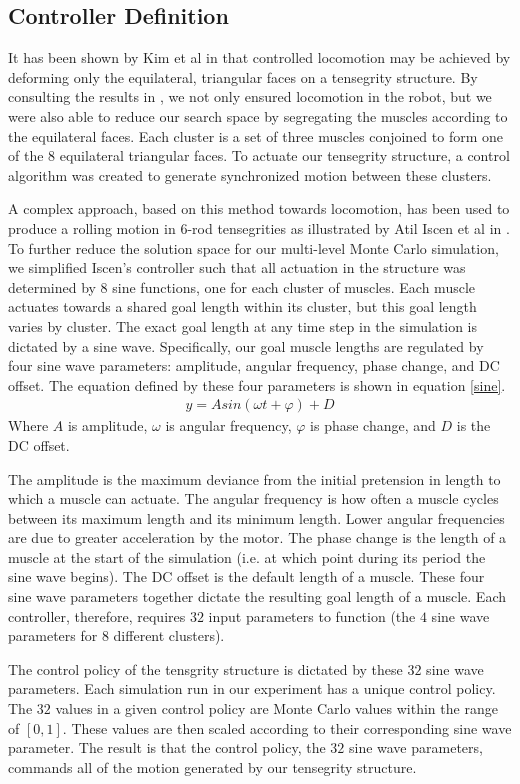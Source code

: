 \documentclass{llncs}
\begin{document}
\subsection{Controller Definition}
\label{controllerdefn} {
It has been shown by Kim et al in \cite{kim2014rapid} that controlled locomotion may be achieved by deforming only the equilateral, triangular faces on a tensegrity structure.
By consulting the results in \cite{kim2014rapid}, we not only ensured locomotion in the robot, but we were also able to reduce our search space by segregating the muscles according to the equilateral faces.
Each cluster is a set of three muscles conjoined to form one of the $8$ equilateral triangular faces.
To actuate our tensegrity structure, a control algorithm was created to generate synchronized motion between these clusters.

A complex approach, based on this method towards locomotion, has been used to produce a rolling motion in $6$-rod tensegrities as illustrated by Atil Iscen et al in \cite{iscen2013controlling}.
To further reduce the solution space for our multi-level Monte Carlo simulation, we simplified Iscen's controller such that all actuation in the structure was determined by $8$ sine functions, one for each cluster of muscles.
Each muscle actuates towards a shared goal length within its cluster, but this goal length varies by cluster.
The exact goal length at any time step in the simulation is dictated by a sine wave.
Specifically, our goal muscle lengths are regulated by four sine wave parameters: amplitude, angular frequency, phase change, and DC offset.
The equation defined by these four parameters is shown in equation \eqref{sine}.
\begin{align}
y = Asin(\omega t + \varphi) + D
\label{sine}
\end{align}
Where $A$ is amplitude, $\omega$ is angular frequency, $\varphi$ is phase change, and $D$ is the DC offset.

The amplitude is the maximum deviance from the initial pretension in length to which a muscle can actuate.
The angular frequency is how often a muscle cycles between its maximum length and its minimum length. 
Lower angular frequencies are due to greater acceleration by the motor.
The phase change is the length of a muscle at the start of the simulation (i.e. at which point during its period the sine wave begins).
The DC offset is the default length of a muscle.
These four sine wave parameters together dictate the resulting goal length of a muscle.
Each controller, therefore, requires $32$ input parameters to function (the $4$ sine wave parameters for $8$ different clusters).

The control policy of the tensgrity structure is dictated by these $32$ sine wave parameters.
Each simulation run in our experiment has a unique control policy.
The $32$ values in a given control policy are Monte Carlo values within the range of $[0,1]$.
These values are then scaled according to their corresponding sine wave parameter. 
The result is that the control policy, the $32$ sine wave parameters, commands all of the motion generated by our tensegrity structure.
}
  
\end{document}
